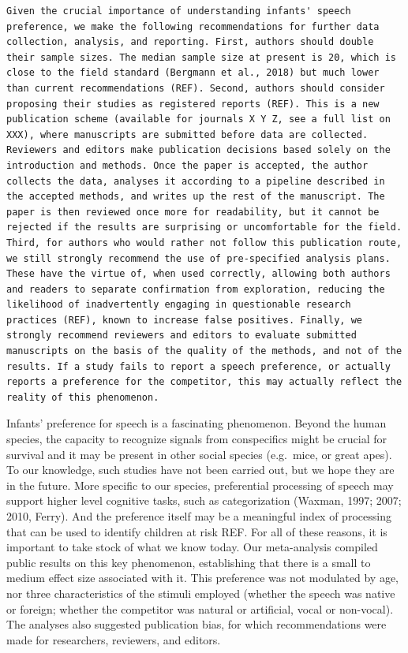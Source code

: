 \documentclass[]{apa6}
\begin{document}
\begin{verbatim}
Given the crucial importance of understanding infants' speech preference, we make the following recommendations for further data collection, analysis, and reporting. First, authors should double their sample sizes. The median sample size at present is 20, which is close to the field standard (Bergmann et al., 2018) but much lower than current recommendations (REF). Second, authors should consider proposing their studies as registered reports (REF). This is a new publication scheme (available for journals X Y Z, see a full list on XXX), where manuscripts are submitted before data are collected. Reviewers and editors make publication decisions based solely on the introduction and methods. Once the paper is accepted, the author collects the data, analyses it according to a pipeline described in the accepted methods, and writes up the rest of the manuscript. The paper is then reviewed once more for readability, but it cannot be rejected if the results are surprising or uncomfortable for the field. Third, for authors who would rather not follow this publication route, we still strongly recommend the use of pre-specified analysis plans. These have the virtue of, when used correctly, allowing both authors and readers to separate confirmation from exploration, reducing the likelihood of inadvertently engaging in questionable research practices (REF), known to increase false positives. Finally, we strongly recommend reviewers and editors to evaluate submitted manuscripts on the basis of the quality of the methods, and not of the results. If a study fails to report a speech preference, or actually reports a preference for the competitor, this may actually reflect the reality of this phenomenon.
\end{verbatim}

Infants' preference for speech is a fascinating phenomenon. Beyond the
human species, the capacity to recognize signals from conspecifics might
be crucial for survival and it may be present in other social species
(e.g.~mice, or great apes). To our knowledge, such studies have not been
carried out, but we hope they are in the future. More specific to our
species, preferential processing of speech may support higher level
cognitive tasks, such as categorization (Waxman, 1997; 2007; 2010,
Ferry). And the preference itself may be a meaningful index of
processing that can be used to identify children at risk REF. For all of
these reasons, it is important to take stock of what we know today. Our
meta-analysis compiled public results on this key phenomenon,
establishing that there is a small to medium effect size associated with
it. This preference was not modulated by age, nor three characteristics
of the stimuli employed (whether the speech was native or foreign;
whether the competitor was natural or artificial, vocal or non-vocal).
The analyses also suggested publication bias, for which recommendations
were made for researchers, reviewers, and editors.

\newpage

\begingroup
\setlength{\parindent}{-0.5in} \setlength{\leftskip}{0.5in}

\hypertarget{refs}{}

\endgroup
\end{document}
